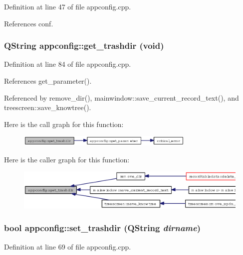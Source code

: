 Definition at line 47 of file appconfig.cpp.

References conf.
\subsubsection{\setlength{\rightskip}{0pt plus 5cm}QString appconfig::get\_\-trashdir (void)}\label{classappconfig_aa1dba748c982e0759e1c13490a68ccf}




Definition at line 84 of file appconfig.cpp.

References get\_\-parameter().

Referenced by remove\_\-dir(), mainwindow::save\_\-current\_\-record\_\-text(), and treescreen::save\_\-knowtree().

Here is the call graph for this function:\begin{figure}[H]
\begin{center}
\leavevmode
\includegraphics[width=241pt]{classappconfig_aa1dba748c982e0759e1c13490a68ccf_cgraph}
\end{center}
\end{figure}


Here is the caller graph for this function:\begin{figure}[H]
\begin{center}
\leavevmode
\includegraphics[width=322pt]{classappconfig_aa1dba748c982e0759e1c13490a68ccf_icgraph}
\end{center}
\end{figure}
\subsubsection{\setlength{\rightskip}{0pt plus 5cm}bool appconfig::set\_\-trashdir (QString {\em dirname})}\label{classappconfig_05797f15022b1c454842471047bc3bf8}




Definition at line 69 of file appconfig.cpp.

